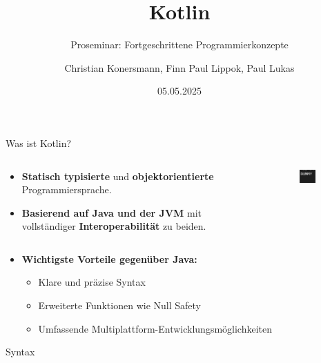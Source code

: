 \documentclass{beamer}
\title{Kotlin}
\subtitle{Proseminar: Fortgeschrittene Programmierkonzepte}
\author[C. Konersmann, F. Lippok, P. Lukas]{
  Christian Konersmann, Finn Paul Lippok, Paul Lukas
}
\date{05.05.2025}
\begin{document}
\frame{\titlepage}

\begin{frame}{Was ist Kotlin?}
  \begin{columns}
    \begin{column}{0.7\textwidth}
      \begin{itemize}
        \item \textbf{Statisch typisierte} und \textbf{objektorientierte} Programmiersprache.
        \item \textbf{Basierend auf Java und der JVM} mit vollständiger \textbf{Interoperabilität} zu beiden.
      \end{itemize}
    \end{column}
    \begin{column}{0.3\textwidth}
      \begin{figure}
        \centering
        \includegraphics[width=0.6\textwidth]{Kotlin Full Color Logo Mark RGB.png}
      \end{figure}
    \end{column}
  \end{columns}
  \pause\vspace{0.5cm}
  \begin{itemize}
    \item \textbf{Wichtigste Vorteile gegenüber Java:} %
    \begin{itemize} %
      \item Klare und präzise Syntax
      \item Erweiterte Funktionen wie Null Safety
      \item Umfassende Multiplattform-Entwicklungsmöglichkeiten
    \end{itemize}
  \end{itemize}
\end{frame}
\begin{frame}{Syntax}
  \tableofcontents[sections={1-4}]  
\end{frame}
\end{document}
